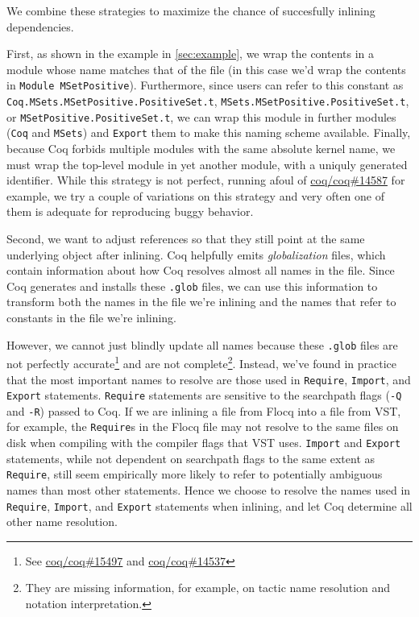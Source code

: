 \documentclass[a4paper,USenglish,cleveref,autoref,thm-restate]{lipics-v2021}
\newcommand{\coqbug}[1]{\href{https://github.com/coq/coq/issues/#1}{coq/coq\##1}}
\begin{document}
We combine these strategies to maximize the chance of succesfully inlining dependencies.

First, as shown in the example in \autoref{sec:example}, we wrap the contents in a module whose name matches that of the file (in this case we'd wrap the contents in \texttt{Module MSetPositive}).
Furthermore, since users can refer to this constant as \texttt{Coq.MSets.MSetPositive.PositiveSet.t}, \texttt{MSets.MSetPositive.PositiveSet.t}, or \texttt{MSetPositive.PositiveSet.t}, we can wrap this module in further modules (\texttt{Coq} and \texttt{MSets}) and \texttt{Export} them to make this naming scheme available.
Finally, because Coq forbids multiple modules with the same absolute kernel name, we must wrap the top-level module in yet another module, with a uniquly generated identifier.
While this strategy is not perfect, running afoul of \coqbug{14587} for example, we try a couple of variations on this strategy and very often one of them is adequate for reproducing buggy behavior.

Second, we want to adjust references so that they still point at the same underlying object after inlining.
Coq helpfully emits \emph{globalization} files, which contain information about how Coq resolves almost all names in the file.
Since Coq generates and installs these \texttt{.glob} files, we can use this information to transform both the names in the file we're inlining and the names that refer to constants in the file we're inlining.

However, we cannot just blindly update all names because these \texttt{.glob} files are not perfectly accurate\footnote{See \coqbug{15497} and \coqbug{14537}} and are not complete\footnote{They are missing information, for example, on tactic name resolution and notation interpretation.}.
Instead, we've found in practice that the most important names to resolve are those used in \texttt{Require}, \texttt{Import}, and \texttt{Export} statements.
\texttt{Require} statements are sensitive to the searchpath flags (\verb|-Q| and \verb|-R|) passed to Coq.
If we are inlining a file from Flocq into a file from VST, for example, the \texttt{Require}s in the Flocq file may not resolve to the same files on disk when compiling with the compiler flags that VST uses.
\texttt{Import} and \texttt{Export} statements, while not dependent on searchpath flags to the same extent as \texttt{Require}, still seem empirically more likely to refer to potentially ambiguous names than most other statements.
Hence we choose to resolve the names used in \texttt{Require}, \texttt{Import}, and \texttt{Export} statements when inlining, and let Coq determine all other name resolution.
\end{document}
